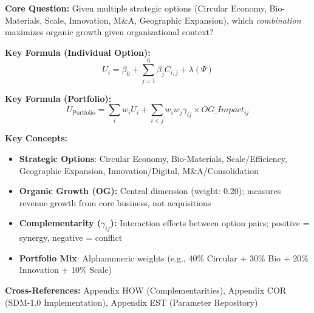 \begin{tcolorbox}[colback=blue!5!white, colframe=blue!75!black,
    title=Quick Reference: Strategy Option Comparison Model v1.0]

\textbf{Core Question:} Given multiple strategic options (Circular Economy, Bio-Materials, Scale, Innovation, M\&A, Geographic Expansion), which \textit{combination} maximizes organic growth given organizational context?

\textbf{Key Formula (Individual Option):}
\begin{equation}
U_i = \beta_0 + \sum_{j=1}^{6} \beta_j C_{i,j} + \lambda(\Psi)
\end{equation}

\textbf{Key Formula (Portfolio):}
\begin{equation}
U_{\text{Portfolio}} = \sum_{i} w_i U_i + \sum_{i<j} w_i w_j \gamma_{ij} \times OG\_Impact_{ij}
\end{equation}

\textbf{Key Concepts:}
\begin{itemize}[nosep]
\item \textbf{Strategic Options}: Circular Economy, Bio-Materials, Scale/Efficiency, Geographic Expansion, Innovation/Digital, M\&A/Consolidation
\item \textbf{Organic Growth (OG):} Central dimension (weight: 0.20); measures revenue growth from core business, not acquisitions
\item \textbf{Complementarity ($\gamma_{ij}$):} Interaction effects between option pairs; positive = synergy, negative = conflict
\item \textbf{Portfolio Mix}: Alphanumeric weights (e.g., 40\% Circular + 30\% Bio + 20\% Innovation + 10\% Scale)
\end{itemize}

\textbf{Cross-References:} Appendix HOW (Complementarities), Appendix COR (SDM-1.0 Implementation), Appendix EST (Parameter Repository)

\end{tcolorbox}



